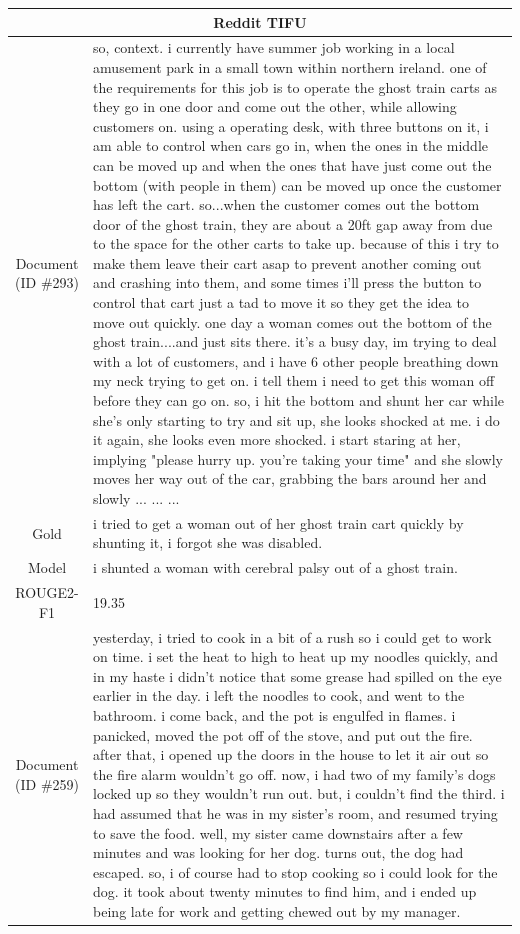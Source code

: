 \begin{table}[bth!]
\scriptsize
\centering
\renewcommand{\arraystretch}{1.3}
\begin{tabular}{c|p{}}
\hline
\multicolumn{2}{c}{Reddit TIFU} \\ \hline
\makecell{Document\\(ID \#293)} & 
so, context. i currently have summer job working in a local amusement park in a small town within northern ireland. one of the requirements for this job is to operate the ghost train carts as they go in one door and come out the other, while allowing customers on. using a operating desk, with three buttons on it, i am able to control when cars go in, when the ones in the middle can be moved up and when the ones that have just come out the bottom (with people in them) can be moved up once the customer has left the cart. so...when the customer comes out the bottom door of the ghost train, they are about a 20ft gap away from due to the space for the other carts to take up. because of this i try to make them leave their cart asap to prevent another coming out and crashing into them, and some times i'll press the button to control that cart just a tad to move it so they get the idea to move out quickly. one day a woman comes out the bottom of the ghost train....and just sits there. it's a busy day, im trying to deal with a lot of customers, and i have 6 other people breathing down my neck trying to get on. i tell them i need to get this woman off before they can go on. so, i hit the bottom and shunt her car while she's only starting to try and sit up, she looks shocked at me. i do it again, she looks even more shocked. i start staring at her, implying "please hurry up. you're taking your time" and she slowly moves her way out of the car, grabbing the bars around her and slowly ... ... ... 
\\ \hline
Gold & 
i tried to get a woman out of her ghost train cart quickly by shunting it, i forgot she was disabled.
\\ \hline
Model & 
i shunted a woman with cerebral palsy out of a ghost train.
\\ \hline
ROUGE2-F1 & 
19.35
\\ \hline
\makecell{Document\\(ID \#259)} & 
yesterday, i tried to cook in a bit of a rush so i could get to work on time. i set the heat to high to heat up my noodles quickly, and in my haste i didn’t notice that some grease had spilled on the eye earlier in the day. i left the noodles to cook, and went to the bathroom. i come back, and the pot is engulfed in flames. i panicked, moved the pot off of the stove, and put out the fire. after that, i opened up the doors in the house to let it air out so the fire alarm wouldn’t go off. now, i had two of my family’s dogs locked up so they wouldn’t run out. but, i couldn’t find the third. i had assumed that he was in my sister’s room, and resumed trying to save the food. well, my sister came downstairs after a few minutes and was looking for her dog. turns out, the dog had escaped. so, i of course had to stop cooking so i could look for the dog. it took about twenty minutes to find him, and i ended up being late for work and getting chewed out by my manager.

\end{tabular}
\end{table}
